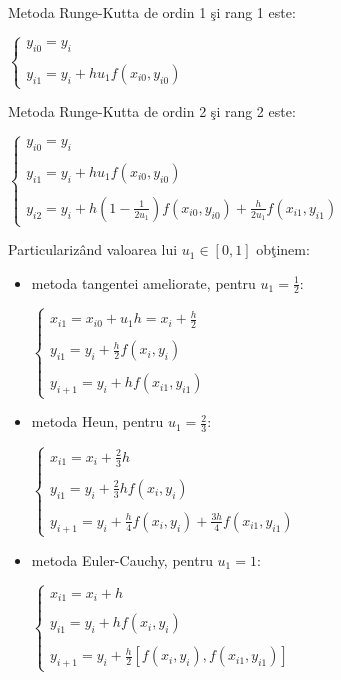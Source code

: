 \documentclass{exam}
\begin{document}
Metoda Runge-Kutta de ordin 1 şi rang 1 este:

$\left\{
	\begin{array}{lll}
		y_{i0} = y_i \\ \\
		y_{i1} = y_i + hu_{1}f(x_{i0},y_{i0})
	\end{array}
	\right.$

Metoda Runge-Kutta de ordin 2 şi rang 2 este:

$\left\{
	\begin{array}{lll}
		y_{i0} = y_i                          \\ \\
		y_{i1} = y_i + hu_{1}f(x_{i0},y_{i0}) \\ \\
		y_{i2} = y_i + h(1-\frac{1}{2u_1})f(x_{i0},y_{i0}) + \frac{h}{2u_1}f(x_{i1},y_{i1})
	\end{array}
	\right.$

Particularizând valoarea lui $u_1 \in [0,1]$ obţinem:
\begin{itemize}
	\item metoda tangentei ameliorate, pentru $u_1 = \frac{1}{2}$:

	      $\left\{
		      \begin{array}{lll}
			      x_{i1} = x_{i0} + u_1h = x_i + \frac{h}{2} \\ \\
			      y_{i1} = y_i + \frac{h}{2}f(x_{i},y_{i})   \\ \\
			      y_{i+1} = y_i + hf(x_{i1},y_{i1})
		      \end{array}
		      \right.$ \\

	\item metoda Heun, pentru $u_1=\frac{2}{3}$:

	      $\left\{
		      \begin{array}{lll}
			      x_{i1} = x_{i} + \frac{2}{3}h             \\ \\
			      y_{i1} = y_i + \frac{2}{3}hf(x_{i},y_{i}) \\ \\
			      y_{i+1} = y_i + \frac{h}{4}f(x_i,y_i)+\frac{3h}{4}f(x_{i1},y_{i1})
		      \end{array}
		      \right.$ \\

	\item metoda Euler-Cauchy, pentru $u_1=1$:

	      $\left\{
		      \begin{array}{lll}
			      x_{i1} = x_{i} + h             \\ \\
			      y_{i1} = y_i + hf(x_{i},y_{i}) \\ \\
			      y_{i+1} = y_i + \frac{h}{2}[f(x_i,y_i),f(x_{i1},y_{i1})]
		      \end{array}
		      \right.$

\end{itemize}
\end{document}
